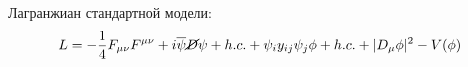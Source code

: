 \documentclass{article}
\begin{document}
 
Лагранжиан стандартной модели:
\begin{equation*}
L = -\frac{1}{4} F_{\mu \nu} F^{\mu \nu} + i \overline{\psi} \cancel D \psi + h.c. + \psi_{i} y_{ij} \psi_{j} \phi + h.c. + |D_{\mu} \phi |^2 - V(\phi )
\end{equation*}
\end{document}
